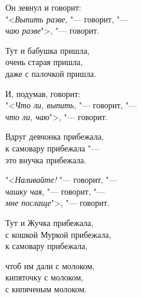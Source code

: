 {    \vspace{0.5cm}

    \parbox{6cm}{Он зевнул и говорит: \\
    "<\textit{Выпить разве}, "--- говорит, "--- \\
    \textit{чаю разве}">, "--- говорит. }

    \vspace{0.5cm}

    \hspace{1cm}
    \parbox{6cm}{Тут и бабушка пришла, \\
    очень старая пришла, \\
    даже с палочкой пришла. } 

    \vspace{0.5cm}

    \parbox{6cm}{И, подумав, говорит: \\
    "<\textit{Что ли, выпить}, "--- говорит, "--- \\
    \textit{что ли, чаю}">, "--- говорит. }

    \vspace{0.5cm}

    \hspace{1cm}
    \parbox{6cm}{Вдруг девчонка прибежала, \\
    к самовару прибежала "--- \\
    это внучка прибежала. }

    \vspace{0.5cm}

    \parbox{6cm}{"<\textit{Наливайте!} "--- говорит, "--- \\
    \textit{чашку чая}, "--- говорит, "--- \\
    \textit{мне послаще}">, "--- говорит. }

    \vspace{0.5cm}

    \hspace{1cm}
    \parbox{6cm}{Тут и Жучка прибежала, \\
    с кошкой Муркой прибежала, \\
    к самовару прибежала, }

    \vspace{0.5cm}

    \parbox{6cm}{чтоб им дали с молоком, \\
    кипяточку с молоком, \\
    с кипяченым молоком. }

    \vspace{0.5cm}

}
